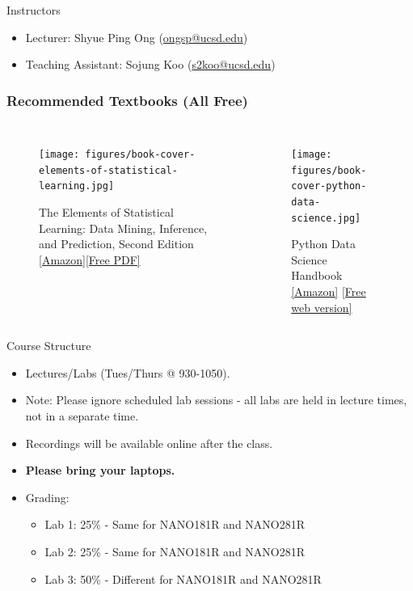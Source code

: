 \documentclass[aspectratio=169]{beamer}
\begin{document}
\begin{frame}{Instructors}
    \begin{itemize}
        \item Lecturer: Shyue Ping Ong (\href{mailto:ongsp@ucsd.edu}{ongsp@ucsd.edu})
        \item Teaching Assistant: Sojung Koo (\href{mailto:s2koo@ucsd.edu}{s2koo@ucsd.edu})
    \end{itemize}
\end{frame}


\begin{frame}
\frametitle{Recommended Textbooks (All Free)}

\begin{columns}
\begin{figure}
    \centering
    \texttt{[image: figures/book-cover-elements-of-statistical-learning.jpg]}
    \caption{The Elements of Statistical Learning: Data Mining, Inference, and Prediction, Second Edition  \href{http://www.amazon.com/dp/0387848576/ref=cm_sw_em_r_mt_dp_U_LTvbEbPHKK8VF}{[Amazon]}\href{http://web.stanford.edu/~hastie/ElemStatLearn/}{[Free PDF]}}
\end{figure}
\begin{figure}
    \centering
    \texttt{[image: figures/book-cover-python-data-science.jpg]}
    \caption{Python Data Science Handbook
        \href{https://www.amazon.com/dp/1491912057/ref=cm_sw_em_r_mt_dp_U_g0vbEb9N7HVQD}{[Amazon]} \href{http://jakevdp.github.io/PythonDataScienceHandbook/}{[Free web version]}}
\end{figure}
\end{columns}
\end{frame}


\begin{frame}{Course Structure}
    \begin{itemize}
        \item Lectures/Labs (Tues/Thurs @ 930-1050).
        \item Note: Please ignore scheduled lab sessions - all labs are held in lecture times, not in a separate time.
        \item Recordings will be available online after the class.
        \item \textbf{Please bring your laptops.}
        \item Grading:
        \begin{itemize}
            \item Lab 1: 25\% - Same for NANO181R and NANO281R
            \item Lab 2: 25\% - Same for NANO181R and NANO281R
            \item Lab 3: 50\% - Different for NANO181R and NANO281R
        \end{itemize}
    \end{itemize}
\end{frame}
\end{document}
